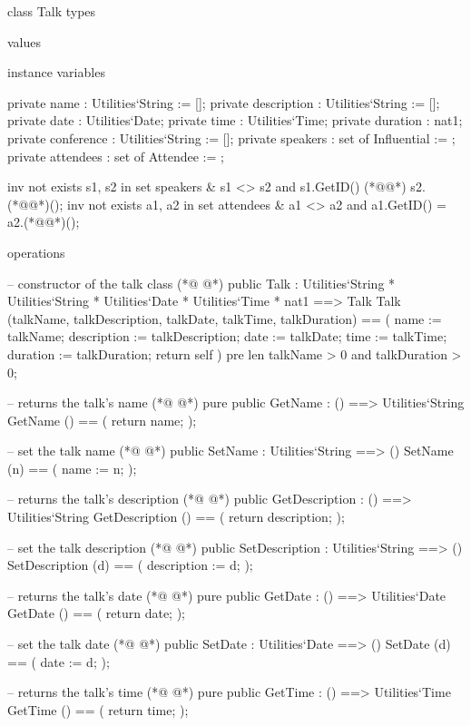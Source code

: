 \begin{vdmpp}[breaklines=true]
class Talk
types

values

instance variables

 private name : Utilities`String := [];
 private description : Utilities`String := [];
 private date : Utilities`Date;
 private time : Utilities`Time;
 private duration : nat1;
 private conference : Utilities`String := [];
 private speakers : set of Influential := {};
 private attendees : set of Attendee := {};
 
 inv not exists s1, s2 in set speakers & s1 <> s2 and s1.GetID() (*@\vdmnotcovered{=}@*) s2.(*@@*)();
 inv not exists a1, a2 in set attendees & a1 <> a2 and a1.GetID() = a2.(*@@*)();
 
operations

 -- constructor of the talk class 
(*@
\label{Talk:23}
@*)
  public Talk :  Utilities`String *  Utilities`String *  Utilities`Date *  Utilities`Time * nat1 ==> Talk
    Talk (talkName, talkDescription, talkDate, talkTime, talkDuration) == (
     name := talkName;
     description := talkDescription;
     date := talkDate;
     time := talkTime;
     duration := talkDuration;
     return self
    )
    pre len talkName > 0 and talkDuration > 0;
    
  -- returns the talk's name
(*@
\label{GetName:35}
@*)
  pure public GetName : () ==> Utilities`String
    GetName () == (
     return name;
    );
    
  -- set the talk name
(*@
\label{SetName:41}
@*)
  public SetName : Utilities`String ==> ()
    SetName (n) == (
     name := n;
    );
    
  -- returns the talk's description
(*@
\label{GetDescription:47}
@*)
  public GetDescription : () ==> Utilities`String
    GetDescription () == (
     return description;
    );
    
  -- set the talk description
(*@
\label{SetDescription:53}
@*)
  public SetDescription : Utilities`String ==> ()
    SetDescription (d) == (
     description := d;
    );
    
  -- returns the talk's date
(*@
\label{GetDate:59}
@*)
  pure public GetDate : () ==> Utilities`Date
    GetDate () == (
     return date;
    );
    
  -- set the talk date
(*@
\label{SetDate:65}
@*)
  public SetDate : Utilities`Date ==> ()
    SetDate (d) == (
     date := d;
    );
    
  -- returns the talk's time
(*@
\label{GetTime:71}
@*)
  pure public GetTime : () ==> Utilities`Time
    GetTime () == (
     return time;
    );
    

\end{vdmpp}
